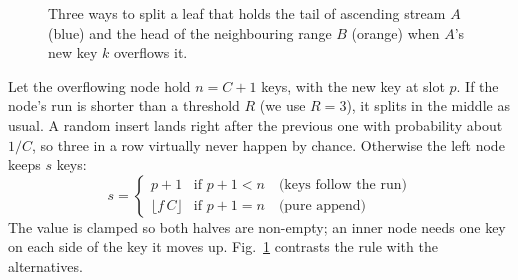 \documentclass[conference]{IEEEtran}
\begin{document}
\begin{figure}[t]
\centering
{}
\caption{Three ways to split a leaf that holds the tail of ascending stream
$A$ (blue) and the head of the neighbouring range $B$ (orange) when $A$'s new
key $k$ overflows it.}
\label{fig:split}
\end{figure}

Let the overflowing node hold $n=C+1$ keys, with the new key at slot $p$.
If the node's run is shorter than a threshold $R$ (we use $R=3$), it splits in
the middle as usual. A random insert lands right after the previous one with
probability about $1/C$, so three in a row virtually never happen by chance.
Otherwise the left node keeps $s$ keys:
\begin{equation}
s=\begin{cases}
p+1 & \text{if } p+1<n \quad\text{(keys follow the run)}\\[2pt]
\lfloor f\,C \rfloor & \text{if } p+1=n \quad\text{(pure append)}
\end{cases}
\label{eq:split}
\end{equation}
The value is clamped so both halves are non-empty; an inner node needs one key
on each side of the key it moves up. Fig.~\ref{fig:split} contrasts the rule
with the alternatives.
\end{document}

